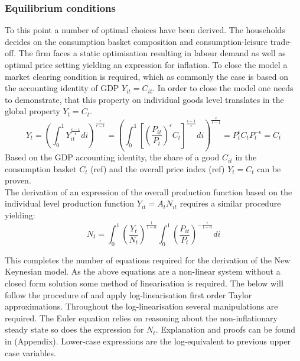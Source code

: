 \documentclass[12pt,a4paper,english]{article} %
\begin{document}
	\subsubsection{Equilibrium conditions}
	To this point a number of optimal choices have been derived. The households decides on the consumption basket composition and consumption-leisure trade-off. The firm faces a static optimisation resulting in labour demand as well as optimal price setting yielding an expression for inflation. To close the model a market clearing condition is required, which as commonly the case is based on the accounting identity of GDP $Y_{it} = C_{it}$. In order to close the model one needs to demonstrate, that this property on individual goods level translates in the global property $Y_t = C_t$.
	\begin{equation}
			Y_t = 
			\left( 
				\int_{0}^{1} Y_{it}^{\frac{\epsilon - 1}{\epsilon}} di 
			\right)^{\frac{\epsilon}{\epsilon - 1}}
			=
			\left( 
			\int_{0}^{1} 
			\left[
			\left( \frac{P_{it}}{P_t} \right)^\epsilon C_t
			\right]^{\frac{\epsilon - 1}{\epsilon}} di 
			\right)^{\frac{\epsilon}{\epsilon - 1}}
			=
			P_t^{\epsilon} C_t P_t^{-\epsilon}
			=
			C_t
	\end{equation}
	Based on the GDP accounting identity, the share of a good $C_{it}$ in the consumption basket $C_t$ (ref) and the overall price index (ref) $Y_t = C_t$ can be proven.\\
	The derivation of an expression of the overall production function based on the individual level production function $Y_{it} = A_t N_{it}$ requires a similar procedure yielding:
	\begin{equation}
		N_t = 	
		\int_{0}^{1} \left( \frac{Y_t}{N_t} \right)^{\frac{1}{1 - \alpha}}
		\int_{0}^{1} \left( \frac{P_{it}}{P_t} \right)^{-\frac{\epsilon}{1 - \alpha}} di
	\end{equation}
	
	This completes the number of equations required for the derivation of the New Keynesian model. As the above equations are a non-linear system without a closed form solution some method of linearisation is required. The below will follow the procedure of \cite{gali_monetary_2008} and apply log-linearisation first order Taylor approximations. Throughout the log-linearisation several manipulations are required. The Euler equation relies on reasoning about the non-inflationary steady state so does the expression for $N_t$. Explanation and proofs can be found in (Appendix). Lower-case expressions are the log-equivalent to previous upper case variables. \\
	
\end{document}
